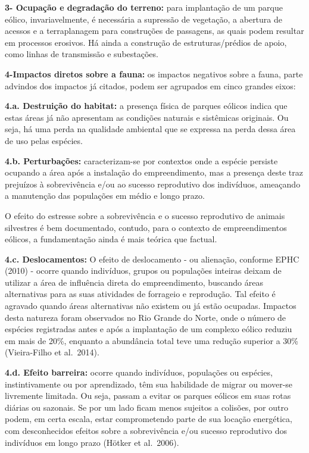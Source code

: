 \documentclass[
  oneside]{scrbook}
\begin{document}
\textbf{3- Ocupação e degradação do terreno:} para implantação de um parque eólico, invariavelmente, é necessária a supressão de vegetação, a abertura de acessos e a terraplanagem para construções de passagens, as quais podem resultar em processos erosivos. Há ainda a construção de estruturas/prédios de apoio, como linhas de transmissão e subestações.

\textbf{4-Impactos diretos sobre a fauna:} os impactos negativos sobre a fauna, parte advindos dos impactos já citados, podem ser agrupados em cinco grandes eixos:

\textbf{4.a. Destruição do habitat:} a presença física de parques eólicos indica que estas áreas já não apresentam as condições naturais e sistêmicas originais. Ou seja, há uma perda na qualidade ambiental que se expressa na perda dessa área de uso pelas espécies.

\textbf{4.b. Perturbações:} caracterizam-se por contextos onde a espécie persiste ocupando a área após a instalação do empreendimento, mas a presença deste traz prejuízos à sobrevivência e/ou ao sucesso reprodutivo dos indivíduos, ameaçando a manutenção das populações em médio e longo prazo.

O efeito do estresse sobre a sobrevivência e o sucesso reprodutivo de animais silvestres é bem documentado, contudo, para o contexto de empreendimentos eólicos, a fundamentação ainda é mais teórica que factual.

\textbf{4.c. Deslocamentos:} O efeito de deslocamento - ou alienação, conforme EPHC (2010) - ocorre quando indivíduos, grupos ou populações inteiras deixam de utilizar a área de influência direta do empreendimento, buscando áreas alternativas para as suas atividades de forrageio e reprodução. Tal efeito é agravado quando áreas alternativas não existem ou já estão ocupadas.
Impactos desta natureza foram observados no Rio Grande do Norte, onde o número de espécies registradas antes e após a implantação de um complexo eólico reduziu em mais de 20\%, enquanto a abundância total teve uma redução superior a 30\% (Vieira-Filho et al.~2014).

\textbf{4.d. Efeito barreira:} ocorre quando indivíduos, populações ou espécies, instintivamente ou por aprendizado, têm sua habilidade de migrar ou mover-se livremente limitada. Ou seja, passam a evitar os parques eólicos em suas rotas diárias ou sazonais. Se por um lado ficam menos sujeitos a colisões, por outro podem, em certa escala, estar comprometendo parte de sua locação energética, com desconhecidos efeitos sobre a sobrevivência e/ou sucesso reprodutivo dos indivíduos em longo prazo (Hötker et al.~2006).
\end{document}
